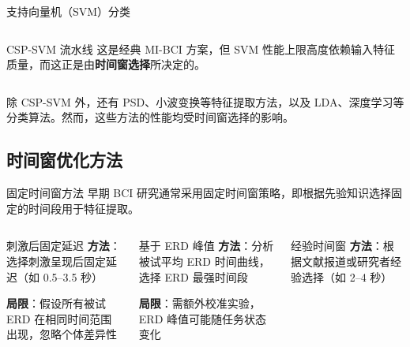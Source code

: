 {\begin{frame}{支持向量机（SVM）分类}
\begin{columns}[T]
\begin{block}{CSP-SVM 流水线}
            \vspace{0.3cm}
            这是经典 MI-BCI 方案，但 SVM 性能上限高度依赖输入特征质量，而这正是由\textbf{时间窗选择}所决定的。
        \end{block}
    \end{columns}
    
    \vspace{0.3cm}
    \scriptsize
    除 CSP-SVM 外，还有 PSD、小波变换等特征提取方法，以及 LDA、深度学习等分类算法\cite{lotte2007review}。然而，这些方法的性能均受时间窗选择的影响。
\end{frame}

\subsection{时间窗优化方法}

\begin{frame}{固定时间窗方法}
    早期 BCI 研究通常采用固定时间窗策略，即根据先验知识选择固定的时间段用于特征提取\cite{lotte2007review}。

    \begin{columns}[T]
        \begin{block}{刺激后固定延迟}
            \scriptsize
            \textbf{方法}：选择刺激呈现后固定延迟（如 0.5--3.5 秒）\cite{tangermann2012review}
            
            \vspace{0.15cm}
            \textbf{局限}：假设所有被试 ERD 在相同时间范围出现，忽略个体差异性
        \end{block}

        \begin{block}{基于 ERD 峰值}
            \scriptsize
            \textbf{方法}：分析被试平均 ERD 时间曲线，选择 ERD 最强时间段\cite{pfurtscheller1999event}
            
            \vspace{0.15cm}
            \textbf{局限}：需额外校准实验，ERD 峰值可能随任务状态变化
        \end{block}

        \begin{block}{经验时间窗}
            \scriptsize
            \textbf{方法}：根据文献报道或研究者经验选择（如 2--4 秒）\cite{lotte2007review}
            

\end{block}
\end{columns}
\end{frame}}
